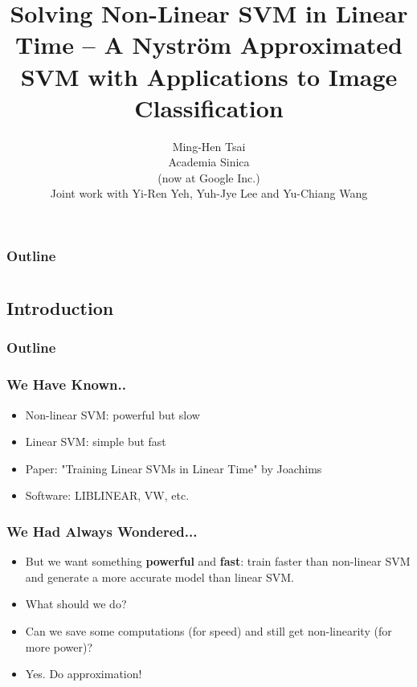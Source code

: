 \documentclass[14pt,xcolor=pstdvips]{beamer}
\def\liblinear{{\sf LIBLINEAR}\xspace}
\def\vw{{\sf VW}\xspace}
\begin{document}
\title[Nystr\"om Decomposition]{Solving Non-Linear SVM in Linear Time -- A Nystr\"om Approximated SVM with Applications to Image Classification}
\author[Ming-Hen Tsai]{
Ming-Hen Tsai\\
Academia Sinica\\ 
(now at Google Inc.)\\
\smallskip
\smallskip
Joint work with Yi-Ren Yeh, Yuh-Jye Lee and Yu-Chiang Wang \\
}
\date[May 24, 2013]{}


\begin{frame}
  \titlepage
\end{frame}

\begin{frame}
  \frametitle{Outline}
  \tableofcontents[pausesections]
\end{frame}


\section{ }
\subsection{Introduction}
\begin{frame}
  \frametitle{Outline}
  \tableofcontents[current]
\end{frame}

\begin{frame}
  \frametitle{We Have Known..}
  \begin{itemize}
    \item Non-linear SVM: powerful but slow 
    \item Linear SVM: simple but fast  
    \item [] Paper: "Training Linear SVMs in Linear Time" by Joachims
    \item [] Software: \liblinear, \vw, etc.
 \end{itemize}
\end{frame}

\begin{frame}
  \frametitle{We Had Always Wondered...}
  \begin{itemize}
    \item But we want something {\bf powerful} and {\bf fast}: train faster than non-linear SVM and generate a more accurate model than linear SVM.
    \pause
    \item [] What should we do? 
    \pause
    \item Can we save some computations (for speed) and still get non-linearity (for more power)?
    \pause
    \item [] Yes. Do approximation!
  \end{itemize}
\end{frame}
\end{document}

